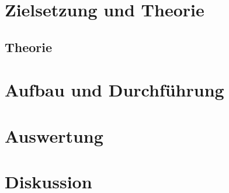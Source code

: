 





\maketitle
\tableofcontents
\newpage

\section{Zielsetzung und Theorie}



\subsection{Theorie}


\section{Aufbau und Durchführung}

% 



% 

\section{Auswertung}


\section{Diskussion}




